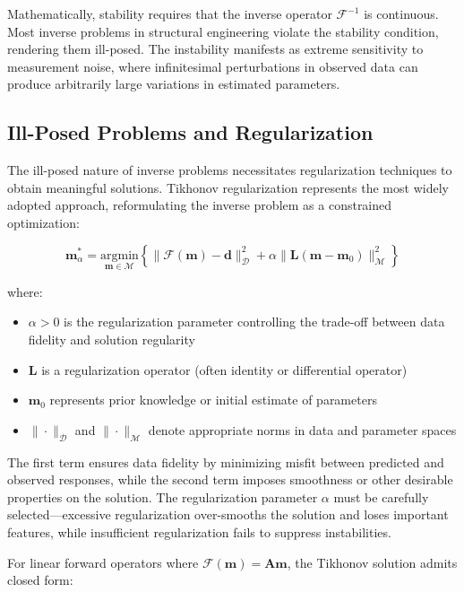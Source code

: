 \documentclass[12pt,a4paper]{report}
\begin{document}
Mathematically, stability requires that the inverse operator $\mathcal{F}^{-1}$ is continuous. Most inverse problems in structural engineering violate the stability condition, rendering them ill-posed. The instability manifests as extreme sensitivity to measurement noise, where infinitesimal perturbations in observed data can produce arbitrarily large variations in estimated parameters.

\subsection{Ill-Posed Problems and Regularization}

The ill-posed nature of inverse problems necessitates regularization techniques to obtain meaningful solutions. Tikhonov regularization represents the most widely adopted approach, reformulating the inverse problem as a constrained optimization:

\begin{equation}
\mathbf{m}_{\alpha}^* = \underset{\mathbf{m} \in \mathcal{M}}{\text{argmin}} \left\{ \|\mathcal{F}(\mathbf{m}) - \mathbf{d}\|_{\mathcal{D}}^2 + \alpha \|\mathbf{L}(\mathbf{m} - \mathbf{m}_0)\|_{\mathcal{M}}^2 \right\}
\end{equation}

where:
\begin{itemize}
\item $\alpha > 0$ is the regularization parameter controlling the trade-off between data fidelity and solution regularity
\item $\mathbf{L}$ is a regularization operator (often identity or differential operator)
\item $\mathbf{m}_0$ represents prior knowledge or initial estimate of parameters
\item $\|\cdot\|_{\mathcal{D}}$ and $\|\cdot\|_{\mathcal{M}}$ denote appropriate norms in data and parameter spaces
\end{itemize}

The first term ensures data fidelity by minimizing misfit between predicted and observed responses, while the second term imposes smoothness or other desirable properties on the solution. The regularization parameter $\alpha$ must be carefully selected—excessive regularization over-smooths the solution and loses important features, while insufficient regularization fails to suppress instabilities.

For linear forward operators where $\mathcal{F}(\mathbf{m}) = \mathbf{A}\mathbf{m}$, the Tikhonov solution admits closed form:
\end{document}
